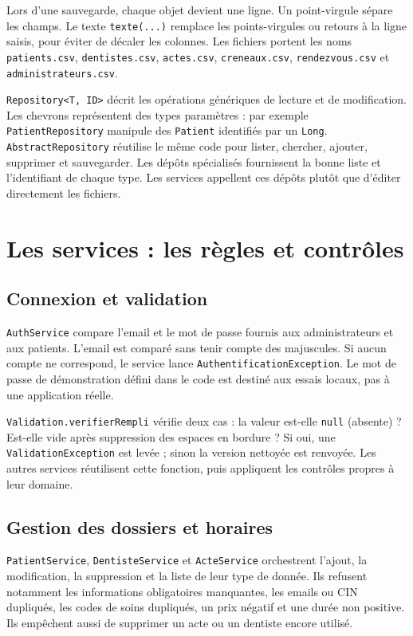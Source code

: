 \documentclass[11pt,a4paper]{report}
\begin{document}
Lors d'une sauvegarde, chaque objet devient une ligne. Un point-virgule sépare les champs. Le texte \texttt{texte(...)} remplace les points-virgules ou retours à la ligne saisis, pour éviter de décaler les colonnes. Les fichiers portent les noms \texttt{patients.csv}, \texttt{dentistes.csv}, \texttt{actes.csv}, \texttt{creneaux.csv}, \texttt{rendezvous.csv} et \texttt{administrateurs.csv}.

\texttt{Repository<T, ID>} décrit les opérations génériques de lecture et de modification. Les chevrons représentent des types paramètres : par exemple \texttt{PatientRepository} manipule des \texttt{Patient} identifiés par un \texttt{Long}. \texttt{AbstractRepository} réutilise le même code pour lister, chercher, ajouter, supprimer et sauvegarder. Les dépôts spécialisés fournissent la bonne liste et l'identifiant de chaque type. Les services appellent ces dépôts plutôt que d'éditer directement les fichiers.

\chapter{Les services : les règles et contrôles}
\section{Connexion et validation}
\texttt{AuthService} compare l'email et le mot de passe fournis aux administrateurs et aux patients. L'email est comparé sans tenir compte des majuscules. Si aucun compte ne correspond, le service lance \texttt{AuthentificationException}. Le mot de passe de démonstration défini dans le code est destiné aux essais locaux, pas à une application réelle.

\texttt{Validation.verifierRempli} vérifie deux cas : la valeur est-elle \texttt{null} (absente) ? Est-elle vide après suppression des espaces en bordure ? Si oui, une \texttt{ValidationException} est levée ; sinon la version nettoyée est renvoyée. Les autres services réutilisent cette fonction, puis appliquent les contrôles propres à leur domaine.

\section{Gestion des dossiers et horaires}
\texttt{PatientService}, \texttt{DentisteService} et \texttt{ActeService} orchestrent l'ajout, la modification, la suppression et la liste de leur type de donnée. Ils refusent notamment les informations obligatoires manquantes, les emails ou CIN dupliqués, les codes de soins dupliqués, un prix négatif et une durée non positive. Ils empêchent aussi de supprimer un acte ou un dentiste encore utilisé.
\end{document}
